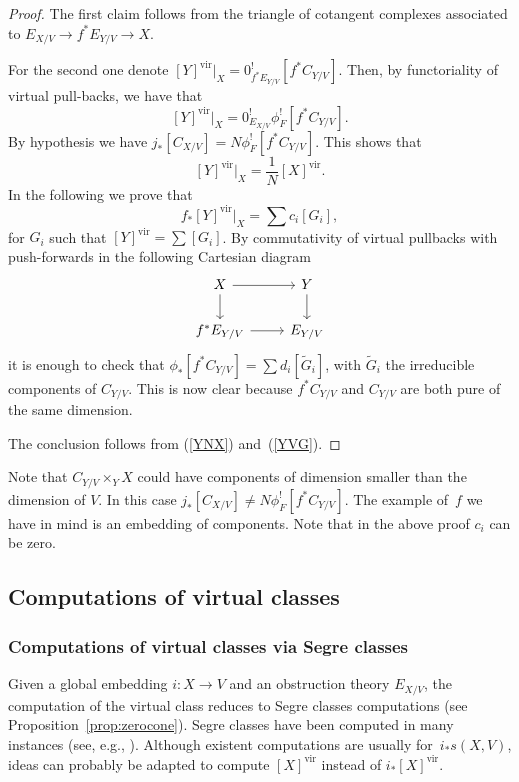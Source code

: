 \documentclass[pdftex]{sigma}
\numberwithin{equation}{section}
\newcommand{\vv}{\mathrm{vir}}
\begin{document}
\begin{proof} The first claim follows from the triangle of cotangent complexes associated to $E_{X/V}\to f^*E_{Y/V}\to X$.

For the second one denote $[Y]^{\vv}|_ X=0_{f^*E_{Y/V}}^![f^*C_{Y/V}]$. Then, by functoriality of virtual pull-backs, we have that
\[[Y]^{\vv}|_ X=0^!_{E_{X/V}}\phi_F^![f^*C_{Y/V}].
\]
By hypothesis we have $j_*[C_{X/V}]=N\phi_F^![f^*C_{Y/V}]$. This shows that
\begin{equation}\label{YNX}[Y]^{\vv}|_ X=\frac{1}{N}[X]^{\vv}.
\end{equation} In the following we prove that
\begin{equation}\label{YVG}f_*[Y]^{\vv}|_ X=\sum c_i[G_i],
\end{equation} for $G_i$ such that $[Y]^\vv=\sum [G_i]$. By commutativity of virtual pullbacks with push-forwards in the following Cartesian diagram
\[
\begin{tikzcd}
X\ar[r]\ar[d] & Y\ar[d] \\ f^*E_{Y/V}\ar[r] & E_{Y/V}
\end{tikzcd}
\]
it is enough to check that $\phi_*[f^*C_{Y/V}]=\sum d_i [\tilde G_i]$, with $\tilde G_i$ the irreducible components of $C_{Y/V}$. This is now clear because $f^*C_{Y/V}$ and $C_{Y/V}$ are both pure of the same dimension.

The conclusion follows from (\ref{YNX}) and~(\ref{YVG}).
\end{proof}

\begin{Remark} Note that $C_{Y/V}\times_Y X$ could have components of dimension smaller than the dimension of $V$. In this case $j_*[C_{X/V}]\neq N\phi_F^![f^*C_{Y/V}]$. The example of~$f$ we have in mind is an embedding of components. Note that in the above proof $c_i$ can be zero.
\end{Remark}

\subsection{Computations of virtual classes} \label{algorithms}
\subsubsection{Computations of virtual classes via Segre classes}
Given a global embedding $i\colon X\to V$ and an obstruction theory $E_{X/V}$, the computation of the virtual class reduces to Segre classes computations (see Proposition~\ref{prop:zerocone}). Segre classes have been computed in many instances (see, e.g., \cite{A1,A, AB,EJP,Helmer, Helmer2, MQ}). Although existent computations are usually for~$i_*s(X,V)$, ideas can probably be adapted
to compute $[X]^{\vv}$ instead of $i_*[X]^{\vv}$.
\end{document}
